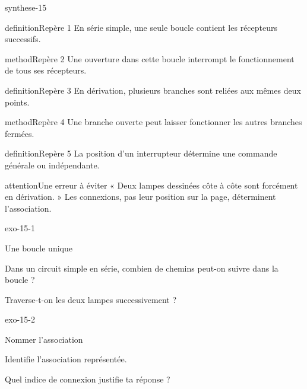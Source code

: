 \documentclass[12pt,twoside,openany]{book}
\begin{document}
\begin{pcFiche}{synthese-15}
\begin{pcEncadre}{definition}{Repère 1}
En série simple, une seule boucle contient les récepteurs successifs.\par
\end{pcEncadre}
\begin{pcEncadre}{method}{Repère 2}
Une ouverture dans cette boucle interrompt le fonctionnement de tous ses récepteurs.\par
\end{pcEncadre}
\begin{pcEncadre}{definition}{Repère 3}
En dérivation, plusieurs branches sont reliées aux mêmes deux points.\par
\end{pcEncadre}
\begin{pcEncadre}{method}{Repère 4}
Une branche ouverte peut laisser fonctionner les autres branches fermées.\par
\end{pcEncadre}
\begin{pcEncadre}{definition}{Repère 5}
La position d’un interrupteur détermine une commande générale ou indépendante.\par
\end{pcEncadre}
\begin{pcEncadre}{attention}{Une erreur à éviter}
« Deux lampes dessinées côte à côte sont forcément en dérivation. » Les connexions, pas leur position sur la page, déterminent l’association.\par
\end{pcEncadre}
\end{pcFiche}
\clearpage{}
\begin{blocLivre}{exo-15-1}
\begin{exercice}[1]{Une boucle unique}
\begin{questions}
\item Dans un circuit simple en série, combien de chemins peut-on suivre dans la boucle ?
\item Traverse-t-on les deux lampes successivement ?
\end{questions}
\end{exercice}\end{blocLivre}
\begin{blocLivre}{exo-15-2}
\begin{exercice}[1]{Nommer l’association}
\begin{questions}
\item Identifie l’association représentée.
\item Quel indice de connexion justifie ta réponse ?
\end{questions}
\end{exercice}\end{blocLivre}
\end{document}
